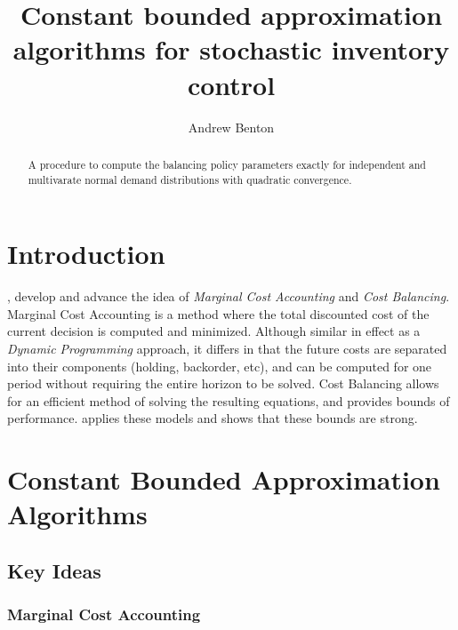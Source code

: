 \documentclass[12pt]{article}
\author{Andrew Benton}
\title{Constant bounded approximation algorithms for stochastic inventory control}
\begin{document}
\maketitle

\begin{abstract}
A procedure to compute the balancing policy parameters exactly for independent and multivarate normal demand distributions with quadratic convergence. 
\end{abstract}

\section{Introduction}

\cite{levi:2007}, \cite{levi:2008} develop and advance the idea of \textit{Marginal Cost Accounting} and \textit{Cost Balancing}. Marginal Cost Accounting is a method where the total discounted cost of the current decision is computed and minimized. Although similar in effect as a \textit{Dynamic Programming} approach, it differs in that the future costs are separated into their components (holding, backorder, etc), and can be computed for one period without requiring the entire horizon to be solved. Cost Balancing allows for an efficient method of solving the resulting equations, and provides bounds of performance. \cite{hurley:2007} applies these models and shows that these bounds are strong.

\section{Constant Bounded Approximation Algorithms}

\subsection{Key Ideas}

\subsubsection{Marginal Cost Accounting}
\end{document}
